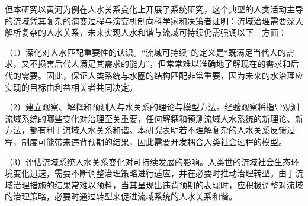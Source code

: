 但本研究以黄河为例在人\textendash{}水关系变化上开展了系统研究，这个典型的人类活动主导的流域凭其复杂的演变过程与演变机制向科学家和决策者证明：流域治理需要深入解析复杂的人\textendash{}水关系，未来实现人水和谐与流域可持续仍需强调以下三方面：

（1）深化对人水匹配重要性的认识。“流域可持续”的定义是“既满足当代人的需求，又不损害后代人满足其需求的能力”，但常常难以准确地了解现在的需求和后代的需要。因此，保证人类系统与水圈的结构匹配非常重要，因为未来的水治理应实现的目标由利益相关者共同决定。

（2）建立观察、解释和预测人与水关系的理论与模型方法。经验观察将指导观测流域系统的哪些变化对治理至关重要，任何解耦和预测流域人\textendash{}水系统的新理论、新方法，都有利于流域人\textendash{}水关系和谐。本研究表明若不理解复杂的人\textendash{}水关系反馈过程，制度可能带来违背预期的结果，因此需要开发耦合人类社会过程的模型。

（3）评估流域系统人\textendash{}水关系变化对可持续发展的影响。人类世的流域社会\textendash{}生态环境变化迅速，需要不断调整治理策略进行适应，并在必要时推动治理转型。由于流域治理措施的结果常难以预料，当其呈现出违背预期的表现时，应积极调整对流域的治理策略，必要时通过转型来促进流域系统的人\textendash{}水关系和谐。
